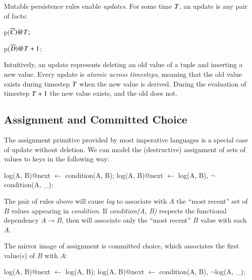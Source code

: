 Mutable persistence rules enable {\em updates}.  For some time $\DT$, an update
is any pair of facts:

\begin{dedalus}
p\nega($\overline{C})@\DT;$
\end{dedalus}

\begin{dedalus}
p\pos($\overline{D})@\DT+1$;
\end{dedalus}


\noindent Intuitively, an update represents deleting an old value of a
tuple and inserting a new value.  Every update is {\em atomic across
  timesteps}, meaning that the old value exists during timestep $\DT$
when the new value is derived.  During the evaluation of timestep
$\DT+1$ the new value exists, and the old does not.

\subsection{Assignment and Committed Choice}
The assignment primitive provided by most imperative languages is a special case
of update without deletion.  We can model the (destructive) assignment of sets
of values to keys in the following way:

\begin{Dedalus}
log(A, B)@next \(\leftarrow\) condition(A, B);
log(A, B)@next \(\leftarrow\) log(A, B), \(\lnot\)condition(A, _);
\end{Dedalus}

The pair of rules above will cause {\em log} to associate with $A$ the ``most
recent'' set of $B$ values appearing in {\em condition}.  If {\em condition(A,
B)} respects the functional dependency $A \to B$, then  will
associate only the ``most recent'' $B$ value with each $A$.

The mirror image of assignment is committed choice, which associates the first
value(s) of $B$ with $A$:

\begin{Dedalus}
log(A, B)@next \(\leftarrow\) log(A, B);
log(A, B)@next \(\leftarrow\) condition(A, B), \(\lnot\)log(A, _);
\end{Dedalus}

